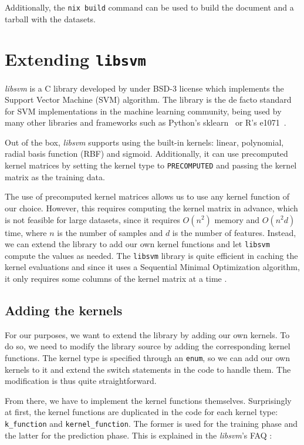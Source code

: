 Additionally, the \texttt{nix build} command can be used to build the
document and a tarball with the datasets.

\section{Extending \texttt{libsvm}}%
\label{sub:impl_c}

\emph{libsvm} is a C library developed by \textcite{CC01a} under BSD-3 license
which implements the Support Vector Machine (SVM) algorithm. The library is the
de facto standard for SVM implementations in the machine learning community,
being used by many other libraries and frameworks such as Python's
sklearn~\cite{ScikitlearnScikitlearn2023} or R's
e1071~\cite{meyer[autE1071MiscFunctions2023}.

Out of the box, \emph{libsvm} supports using the built-in kernels: linear,
polynomial, radial basis function (RBF) and sigmoid. Additionally, it can use
precomputed kernel matrices by setting the kernel type to \texttt{PRECOMPUTED}
and passing the kernel matrix as the training data.

The use of precomputed kernel matrices allows us to use any kernel function
of our choice. However, this requires computing the kernel matrix in advance,
which is not feasible for large datasets, since it requires $O(n^2)$ memory and
$O(n^2d)$ time, where $n$ is the number of samples and $d$ is the number of
features.
Instead, we can extend the library to add our own kernel functions
and let \texttt{libsvm} compute the values as needed.
The \texttt{libsvm} library is quite efficient in caching the kernel evaluations
and since it uses a Sequential Minimal Optimization algorithm, it only requires
some columns of the kernel matrix at a time \cite{CC01a}.

\subsection{Adding the kernels}

For our purposes, we want to extend the library by adding our own kernels. To do
so, we need to modify the library source by adding the corresponding kernel
functions. The kernel type is specified through an \texttt{enum}, so we can add
our own kernels to it and extend the switch statements in the code to handle
them. The modification is thus quite straightforward.
\cite{arquemartinezDissenyImplementacioEstudi2021}

From there, we have to implement the kernel functions themselves. Surprisingly
at first, the kernel functions are duplicated in the code for each kernel type:
\texttt{k\_function} and \texttt{kernel\_function}. The former is used for the
training phase and the latter for the prediction phase. This is explained in the
\emph{libsvm}'s FAQ \cite{LIBSVMFAQ}:

